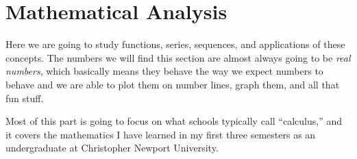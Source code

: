 \part{Mathematical Analysis}
\thispagestyle{empty}
Here we are going to study functions, series, sequences, and applications of these concepts.
The numbers we will find this section are almost always going to be \emph{real numbers},
which basically means they behave the way we expect numbers to behave and we are able to plot them on number lines, graph them, and all that fun stuff.

Most of this part is going to focus on what schools typically call ``calculus,''
and it covers the mathematics I have learned in my first three semesters as an undergraduate at Christopher Newport University.

\setcounter{section}{0}











